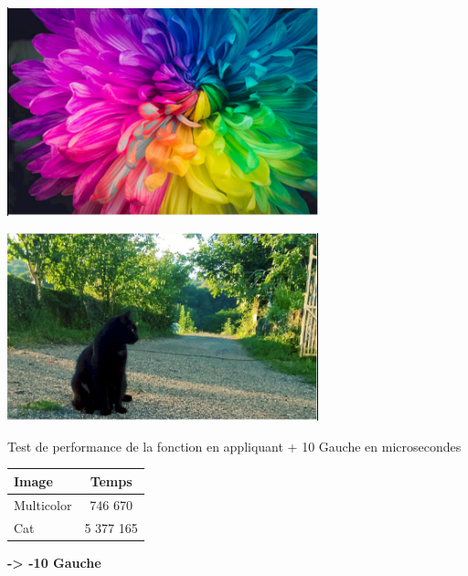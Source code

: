 \documentclass{article}
\begin{document}
\begin{center} 
    \includegraphics[width=9cm]{../Image_fonctions/Multicolor/Selected+10L.PNG}
\end{center}
\begin{center} 
    \includegraphics[width=9cm]{../Image_fonctions/Cat/Selected+10L.PNG}
\end{center}

\begin{center}
\medbreak
Test de performance de la fonction en appliquant + 10 Gauche en microsecondes
\bigbreak
   \begin{tabular}{ | l | c | }
     \hline
     Image & Temps \\
     \hline
     Multicolor & 746 670 \\
     \hline
     Cat & 5 377 165 \\
     \hline
   \end{tabular}
 \end{center}
 
\bigbreak

\textbf{-> -10 Gauche}
\end{document}
